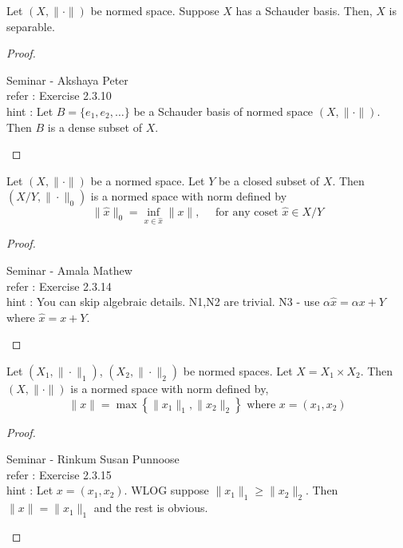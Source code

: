 \begin{lemma}[separable]
	Let $(X,\|\cdot\|)$ be normed space.
	Suppose $X$ has a Schauder basis.
	Then, $X$ is separable.
\end{lemma}
\begin{proof}
\begin{important}
	Seminar - Akshaya Peter\\
	refer : Exercise 2.3.10\\
	hint : Let $B = \{ e_1,e_2, \dots \}$ be a Schauder basis of normed space $(X,\|\cdot\|)$. Then $B$ is a dense subset of $X$.
\end{important}
\end{proof}

\begin{lemma}
	Let $(X,\| \cdot \|)$ be a normed space.
	Let $Y$ be a closed subset of $X$.
	Then $(X/Y,\|\cdot\|_0)$ is a normed space with norm defined by
	$$\|\hat{x}\|_0 = \inf_{x \in \hat{x}} \| x \|, \quad \text{ for any coset } \hat{x} \in X/Y $$
\end{lemma}
\begin{proof}
\begin{important}
	Seminar - Amala Mathew\\
	refer : Exercise 2.3.14\\
	hint : You can skip algebraic details. N1,N2 are trivial. N3 - use $\alpha \hat{x} = \alpha x + Y$ where $\hat{x} = x+Y$.
\end{important}
\end{proof}
\begin{lemma}
	Let $(X_1,\|\cdot\|_1)$, $(X_2,\|\cdot\|_2)$ be normed spaces.
	Let $X = X_1 \times X_2$.
	Then $(X,\|\cdot\|)$ is a normed space with norm defined by,
	$$ \| x \| = \max \left\{ \|x_1\|_1,\|x_2\|_2 \right\} \text{ where } x = (x_1,x_2) $$
\end{lemma}
\begin{proof}
\begin{important}
	Seminar - Rinkum Susan Punnoose\\
	refer : Exercise 2.3.15\\
	hint : Let $x = (x_1,x_2)$. WLOG suppose $\|x_1\|_1 \ge \|x_2\|_2$. Then $\| x \| = \| x_1 \|_1$ and the rest is obvious.
\end{important}
\end{proof}

